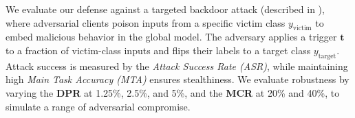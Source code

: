 \begin{table*}[h]
    \caption{MTA (\%) and ASR (\%) metrics at different Data Poisoning Rates (DPR) for the CIFAR-10, CINC-10 and EMNIST datasets. The MCR is fixed at 20\%. DROP achieves low ASR for all DPR, while existing defenses fail to mitigate the attack. The lightweight variant DROPlet achieves higher MTA than DROP and is robust in all cases, except for some extremely stealthy attacks (1.25\% DPR, CIFAR-10). The learning configurations are C4 for CIFAR-10 (same for CINIC-10) and C5 for EMNIST. Refer to \cref{tab:fl_setup_exps} and \cref{tab:fl_setup_exps_emnist} for learning configuration details.   
    }
    \label{tab:fl_vary_dpr}
\end{table*}

 We evaluate our defense against a targeted backdoor attack (described in ), where adversarial clients poison inputs from a specific victim class \(y_{\text{victim}}\) to embed malicious behavior in the global model. The adversary applies a trigger \(\mathbf{t}\) to a fraction of victim-class inputs and flips their labels to a target class \(y_{\text{target}}\). Attack success is measured by the \textit{Attack Success Rate (ASR)}, while maintaining high \textit{Main Task Accuracy (MTA)} ensures stealthiness. We evaluate robustness by varying the \textbf{DPR} at 1.25\%, 2.5\%, and 5\%, and the \textbf{MCR} at 20\% and 40\%, to simulate a range of  adversarial compromise.

